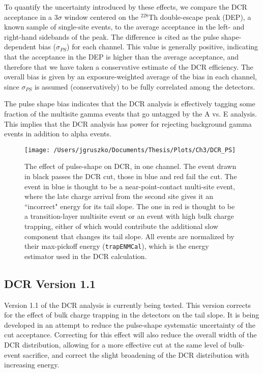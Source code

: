 To quantify the uncertainty introduced by these effects, we compare the DCR acceptance in a 3$\sigma$ window centered on the $^{228}$Th double-escape peak (DEP), a known sample of single-site events, to the average acceptance in the left- and right-hand sidebands of the peak. The difference is cited as the pulse shape-dependent bias ($\sigma_{PS}$) for each channel. This value is generally positive, indicating that the acceptance in the DEP is higher than the average acceptance, and therefore that we have taken a conservative estimate of the DCR efficiency. The overall bias is given by an exposure-weighted average of the bias in each channel, since $\sigma_{PS}$ is assumed (conservatively) to be fully correlated among the detectors. 

The pulse shape bias indicates that the DCR analysis is effectively tagging some fraction of the multisite gamma events that go untagged by the A vs. E analysis. This implies that the DCR analysis has power for rejecting background gamma events in addition to alpha events.

\begin{figure}[]
 \centering
 \texttt{[image: /Users/jgruszko/Documents/Thesis/Plots/Ch3/DCR\_PS]}
 \caption[Sample waveforms demonstrating the effect of pulse-shape on DCR]{The effect of pulse-shape on DCR, in one channel. The event drawn in black passes the DCR cut, those in blue and red fail the cut. The event in blue is thought to be a near-point-contact multi-site event, where the late charge arrival from the second site gives it an ``incorrect" energy for its tail slope. The one in red is thought to be a transition-layer multisite event or an event with high bulk charge trapping, either of which would contribute the additional slow component that changes its tail slope. All events are normalized by their max-pickoff energy ({\tt trapENMCal}), which is the energy estimator used in the DCR calculation.} 
 \label{fig:DCR_PS}
\end{figure}

\subsection{DCR Version 1.1}\label{ssec:dcr_ct}
Version 1.1 of the DCR analysis is currently being tested. This version corrects for the effect of bulk charge trapping in the detectors on the tail slope. It is being developed in an attempt to reduce the pulse-shape systematic uncertainty of the cut acceptance. Correcting for this effect will also reduce the overall width of the DCR distribution, allowing for a more effective cut at the same level of bulk-event sacrifice, and correct the slight broadening of the DCR distribution with increasing energy. 
 
